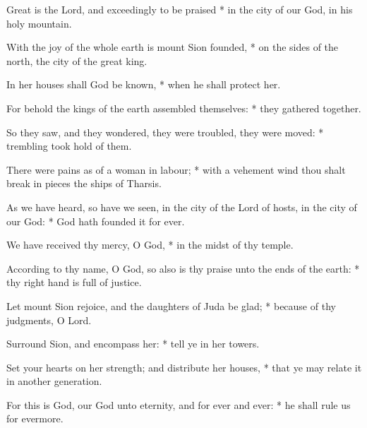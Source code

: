 ﻿\item Great is the Lord, and exceedingly to be praised * in the city of our God, in his holy mountain.
\item With the joy of the whole earth is mount Sion founded, * on the sides of the north, the city of the great king.
\item In her houses shall God be known, * when he shall protect her.
\item For behold the kings of the earth assembled themselves: * they gathered together.
\item So they saw, and they wondered, they were troubled, they were moved: * trembling took hold of them.
\item There were pains as of a woman in labour; * with a vehement wind thou shalt break in pieces the ships of Tharsis.
\item As we have heard, so have we seen, in the city of the Lord of hosts, in the city of our God: * God hath founded it for ever.
\item We have received thy mercy, O God, * in the midst of thy temple.
\item According to thy name, O God, so also is thy praise unto the ends of the earth: * thy right hand is full of justice.
\item Let mount Sion rejoice, and the daughters of Juda be glad; * because of thy judgments, O Lord.
\item Surround Sion, and encompass her: * tell ye in her towers.
\item Set your hearts on her strength; and distribute her houses, * that ye may relate it in another generation.
\item For this is God, our God unto eternity, and for ever and ever: * he shall rule us for evermore.